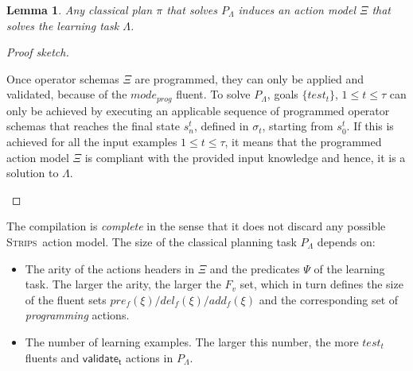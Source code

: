 \documentclass[letterpaper]{article} %
\newcommand{\strips}{\textsc{Strips}}     %
\newtheorem{lemma}[theorem]{Lemma}
\begin{document}
\begin{lemma}
Any classical plan $\pi$ that solves $P_{\Lambda}$ induces an action model $\Xi$ that solves the learning task $\Lambda$.
\end{lemma}

\begin{proof}[Proof sketch]
\begin{small}
Once operator schemas $\Xi$ are programmed, they can only be applied and validated, because of the $mode_{prog}$ fluent. To solve $P_{\Lambda}$, goals $\{test_t\}$, {\small $1\leq t\leq \tau$} can only be achieved by executing an applicable sequence of programmed operator schemas that reaches the final state $s_n^t$, defined in $\sigma_t$, starting from $s_0^t$. If this is achieved for all the input examples {\small $1\leq t\leq \tau$}, it means that the programmed action model $\Xi$ is compliant with the provided input knowledge and hence, it is a solution to $\Lambda$.
\end{small}
\end{proof}

The compilation is {\em complete} in the sense that it does not discard any possible \strips\ action model. The size of the classical planning task $P_{\Lambda}$ depends on:
\begin{itemize}
\item The arity of the actions headers in $\Xi$ and the predicates $\Psi$ of the learning task. The larger the arity, the larger the $F_v$ set, which in turn defines the size of the fluent sets $pre_f(\xi)/del_f(\xi)/add_f(\xi)$ and the corresponding set of {\em programming} actions.
\item The number of learning examples. The larger this number, the more $test_t$ fluents and $\mathsf{validate_{t}}$ actions in $P_{\Lambda}$.
\end{itemize}
\end{document}
